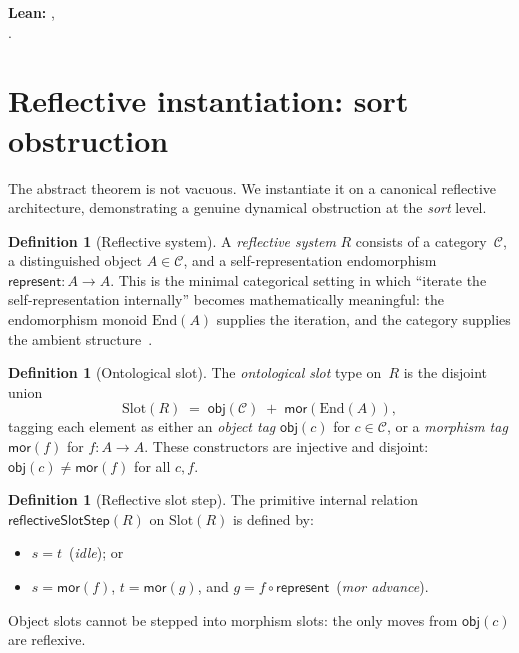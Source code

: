 \documentclass[11pt]{article}
\theoremstyle{plain}
\theoremstyle{definition}
\newtheorem{definition}[theorem]{Definition}
\theoremstyle{remark}
\newcommand{\obj}{\mathsf{obj}}
\newcommand{\mor}{\mathsf{mor}}
\newcommand{\represent}{\mathsf{represent}}
\begin{document}
\smallskip
\noindent\textbf{Lean:}
,\\
.

\section{Reflective instantiation: sort obstruction}\label{sec:reflective}

The abstract theorem is not vacuous.  We instantiate it on a canonical reflective
architecture, demonstrating a genuine dynamical obstruction at the \emph{sort} level.

\begin{definition}[Reflective system]\label{def:reflective-system}
A \emph{reflective system} $R$ consists of a category~$\mathcal{C}$, a distinguished
object $A \in \mathcal{C}$, and a self-representation endomorphism
$\represent : A \to A$.  This is the minimal categorical setting in which ``iterate the
self-representation internally'' becomes mathematically meaningful: the endomorphism
monoid $\mathrm{End}(A)$ supplies the iteration, and the category supplies the ambient
structure~\cite{lawvere1969,yanofsky2003}.
\end{definition}

\begin{definition}[Ontological slot]\label{def:slot}
The \emph{ontological slot} type on~$R$ is the disjoint union
\[
  \mathrm{Slot}(R) \;=\; \obj(\mathcal{C}) \;+\; \mor(\mathrm{End}(A)),
\]
tagging each element as either an \emph{object tag} $\obj(c)$ for $c \in \mathcal{C}$,
or a \emph{morphism tag} $\mor(f)$ for $f : A \to A$.  These constructors are injective
and disjoint: $\obj(c) \neq \mor(f)$ for all $c, f$.
\end{definition}

\begin{definition}[Reflective slot step]\label{def:slotstep}
The primitive internal relation $\mathsf{reflectiveSlotStep}(R)$ on $\mathrm{Slot}(R)$
is defined by:
\begin{itemize}[nosep]
  \item $s = t$ \,(\emph{idle}); or
  \item $s = \mor(f)$, $t = \mor(g)$, and $g = f \circ \represent$ \,(\emph{mor advance}).
\end{itemize}
Object slots cannot be stepped into morphism slots: the only moves from $\obj(c)$ are
reflexive.
\end{definition}
\end{document}
